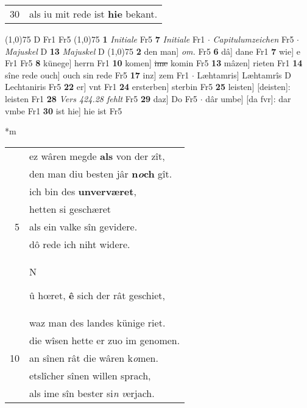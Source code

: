 \documentclass[8pt,a4paper,notitlepage]{article}
\begin{document}
\begin{table}[ht]
\begin{minipage}[t]{0.5\linewidth}
\begin{tabular}{rl}
30 & als iu mit rede ist \textbf{hie} bekant.\\ 
\end{tabular}
\scriptsize
\line(1,0){75} \newline
D Fr1 Fr5 \newline
\line(1,0){75} \newline
\textbf{1} \textit{Initiale} Fr5  \textbf{7} \textit{Initiale} Fr1   $\cdot$ \textit{Capitulumzeichen} Fr5   $\cdot$ \textit{Majuskel} D  \textbf{13} \textit{Majuskel} D  \newline
\line(1,0){75} \newline
\textbf{2} den man] \textit{om.} Fr5 \textbf{6} dâ] dane Fr1 \textbf{7} wie] e Fr1 Fr5 \textbf{8} künege] herrn Fr1 \textbf{10} komen] \sout{ime} komin Fr5 \textbf{13} mâzen] rieten Fr1 \textbf{14} sîne rede ouch] ouch sin rede Fr5 \textbf{17} inz] zem Fr1  $\cdot$ Læhtamris] Læhtamrîs D Lechtaniris Fr5 \textbf{22} er] vnt Fr1 \textbf{24} ersterben] sterbin Fr5 \textbf{25} leisten] [deisten]: leisten Fr1 \textbf{28} \textit{Vers 424.28 fehlt} Fr5  \textbf{29} daz] Do Fr5  $\cdot$ dâr umbe] [da fvr]: dar vmbe Fr1 \textbf{30} ist hie] hie ist Fr5 \newline
\end{minipage}
\hspace{0.5cm}
\begin{minipage}[t]{0.5\linewidth}
\small
\begin{center}*m
\end{center}
\begin{tabular}{rl}
 & ez wâren megde \textbf{als} von der zît,\\ 
 & den man diu besten jâr \textbf{n\textit{o}ch} gît.\\ 
 & ich bin des \textbf{unverværet},\\ 
 & hetten si geschæret\\ 
5 & als ein valke sîn gevidere.\\ 
 & dô rede ich niht widere.\\ 
 & \begin{large}N\end{large}û hœret, \textbf{ê} sich der rât geschiet,\\ 
 & waz man des landes künige riet.\\ 
 & die wîsen hette er zuo im genomen.\\ 
10 & an sînen rât die wâren k\textit{o}men.\\ 
 & etslîcher sînen willen sprach,\\ 
 & als ime sîn bester si\textit{n} \textit{v}erjach.\\ 

\end{tabular}
\end{minipage}
\end{table}
\end{document}
